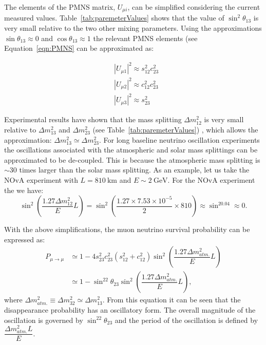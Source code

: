 The elements of the PMNS matrix, $U_{\mu i}$, can be simplified
considering the current measured values.
Table~\ref{tab:paremeterValues} shows that the value of
$\sin^2\theta_{13}$ is very small relative to the two other mixing
parameters. Using the approximations $\sin\theta_{13} \approx 0$
and $\cos\theta_{13} \approx 1$ the relevant PMNS elements (see
Equation~\ref{eqn:PMNS} can be approximated as:

\begin{equation}
\begin{aligned}
&|U_{\mu 1}|^2  \approx s_{12}^2c_{23}^2 \\
&|U_{\mu 2}|^2  \approx c_{12}^2c_{23}^2 \\
&|U_{\mu 3}|^2  \approx s_{23}^2
\end{aligned}
\label{eqn:simpleficationMatrixElements}
\end{equation}


Experimental results have shown that the mass splitting $\Delta
m_{12}^2$ is very small relative to $\Delta m_{13}^2$ and $\Delta
m_{23}^2$ (see Table~\ref{tab:paremeterValues}) \cite{pdg}, which
allows the approximation: $\Delta m_{13}^2 \simeq \Delta
m_{23}^2$. 
For long baseline neutrino oscillation experiments the
oscillations associated with the atmospheric and solar mass splittings
can be approximated to be de-coupled. This is because the atmospheric
mass splitting is $\sim$30 times larger than the solar mass splitting.  
As an example, let us take the NOvA experiment with $L =
810~\text{km}$ and $E \sim 2~\text{GeV}$. For the NOvA experiment the
we have:
\begin{equation}
\sin^2\left(\dfrac{1.27 \Delta m^2_{12}}{E} L \right) = \sin^2
\left(\dfrac{1.27 \times 7.53 \times 10^{-5}}{2} \times 810 \right)
\approx \sin^20.04 \approx 0.
\end{equation}

With the above simplifications, the muon neutrino survival probability
can be expressed as:
\begin{equation}
  \begin{aligned}
    P_{\mu \rightarrow \mu} 
    &\simeq 1 - 4 s_{23}^2c_{23}^2(s_{12}^2 + c_{12}^2) \sin^2 \left(
      \dfrac{1.27\Delta m_{atm.}^2}{E} L \right)\\  
    &\simeq 1 - \sin^22\theta_{23}\sin^2 \left( \dfrac{1.27\Delta
        m_{atm.}^2}{E} L  \right),  
  \end{aligned}
\end{equation}
\noindent where $\Delta m^2_{atm.} \equiv \Delta m^2_{32} \simeq
\Delta m^2_{13}$. From this equation it can be seen that the
disappearance probability has an oscillatory form. The overall
magnitude of the oscillation is governed by $\sin^22\theta_{23}$ and
the period of the oscillation is defined by $\dfrac{\Delta m_{atm.}^2 L}{E}$.


